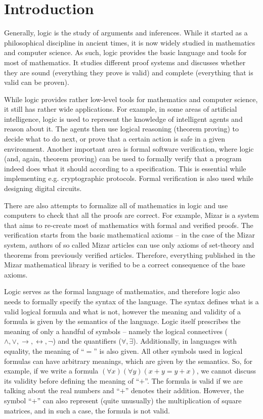 
\chapter{Introduction}

Generally, logic is the study of arguments and inferences. While it started as a philosophical discipline in ancient times, it is now widely studied in mathematics and computer science. As such, logic provides the basic language and tools for most of mathematics. It studies different proof systems and discusses whether they are sound (everything they prove is valid) and complete (everything that is valid can be proven). 

While logic provides rather low-level tools for mathematics and computer science, it still has rather wide applications. For example, in some areas of artificial intelligence, logic is used to represent the knowledge of intelligent agents and reason about it. The agents then use logical reasoning (theorem proving) to decide what to do next, or prove that a certain action is safe in a given environment. Another important area is formal software verification, where logic (and, again, theorem proving) can be used to formally verify that a program indeed does what it should according to a specification. This is essential while implementing e.g. cryptographic protocols. Formal verification is also used while designing digital circuits.

There are also attempts to formalize all of mathematics in logic and use computers to check that all the proofs are correct. For example, Mizar is a system that aims to re-create most of mathematics with formal and verified proofs. The verification starts from the basic mathematical axioms -- in the case of the Mizar system, authors of so called Mizar articles can use only axioms of set-theory and theorems from previously verified articles. Therefore, everything published in the Mizar mathematical library is verified to be a correct consequence of the base axioms.

Logic serves as the formal language of mathematics, and therefore logic also needs to formally specify the syntax of the language. The syntax defines what is a valid logical formula and what is not, however the meaning and validity of a formula is given by the semantics of the language. Logic itself prescribes the meaning of only a handful of symbols -- namely the logical connectives ($\land, \lor, \to, \leftrightarrow, \neg$) and the quantifiers ($\forall, \exists $). Additionally, in languages with equality, the meaning of ``$=$'' is also given. All other symbols used in logical formulas can have arbitrary meanings, which are given by the semantics. So, for example, if we write a formula $(\forall x)(\forall y)(x + y = y + x)$, we cannot discuss its validity before defining the meaning of ``$+$''. The formula is valid if we are talking about the real numbers and ``$+$'' denotes their addition.  However, the symbol ``$+$'' can also represent (quite unusually) the multiplication of square matrices, and in such a case, the formula is not valid.

